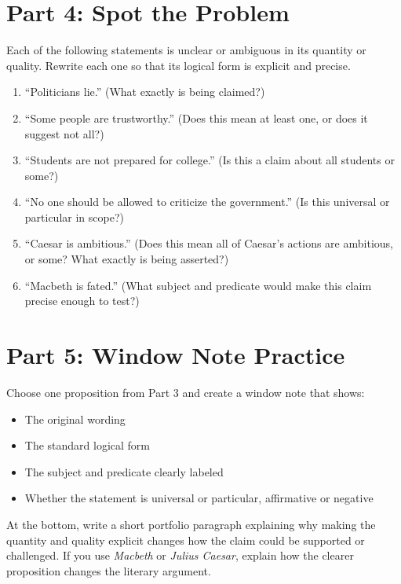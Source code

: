 \documentclass[12pt]{article}
\begin{document}
\section*{Part 4: Spot the Problem}
Each of the following statements is unclear or ambiguous in its quantity or quality. Rewrite each one so that its logical form is explicit and precise.

\begin{enumerate}[leftmargin=*]
\item “Politicians lie.” (What exactly is being claimed?)

\item “Some people are trustworthy.” (Does this mean at least one, or does it suggest not all?)

\item “Students are not prepared for college.” (Is this a claim about all students or some?)

\item “No one should be allowed to criticize the government.” (Is this universal or particular in scope?)
\item “Caesar is ambitious.” (Does this mean all of Caesar's actions are ambitious, or some? What exactly is being asserted?)
\item “Macbeth is fated.” (What subject and predicate would make this claim precise enough to test?)
\end{enumerate}

\section*{Part 5: Window Note Practice}
Choose one proposition from Part 3 and create a window note that shows:
\begin{itemize}
\item The original wording
\item The standard logical form
\item The subject and predicate clearly labeled
\item Whether the statement is universal or particular, affirmative or negative
\end{itemize}

At the bottom, write a short portfolio paragraph explaining why making the quantity and quality explicit changes how the claim could be supported or challenged. If you use \textit{Macbeth} or \textit{Julius Caesar}, explain how the clearer proposition changes the literary argument.
\end{document}
